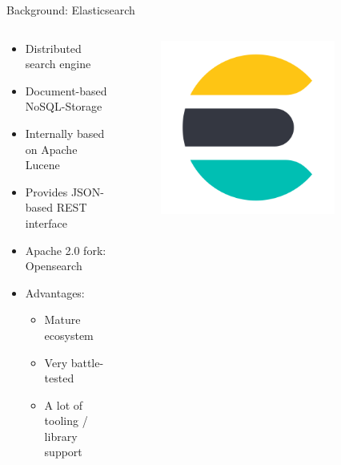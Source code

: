 \documentclass[compress,aspectratio=169]{beamer}
\begin{document}
  \begin{frame}{Background: Elasticsearch}
    \begin{columns}
      \begin{column}{0.5\textwidth}
        \begin{itemize}
          \item Distributed search engine
          \item Document-based NoSQL-Storage
          \item Internally based on Apache Lucene
          \item Provides JSON-based REST interface
          \item Apache 2.0 fork: Opensearch
          \item Advantages:
            \begin{itemize}
              \item Mature ecosystem
              \item Very battle-tested
              \item A lot of tooling / library support
            \end{itemize}
        \end{itemize}
      \end{column}
      \begin{column}{0.5\textwidth}
        \begin{figure}
        \includegraphics[width=0.8\textwidth]{./assets/es.png}
      \end{figure}
      \end{column}
    \end{columns}
  \end{frame}
\end{document}
